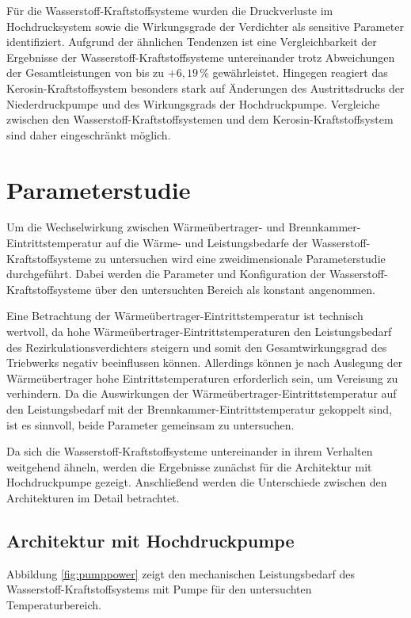 Für die Wasserstoff-Kraftstoffsysteme wurden die Druckverluste im Hochdrucksystem sowie die Wirkungsgrade der Verdichter als sensitive Parameter identifiziert. Aufgrund der ähnlichen Tendenzen ist eine Vergleichbarkeit der Ergebnisse der Wasserstoff-Kraftstoffsysteme untereinander trotz Abweichungen der Gesamtleistungen von bis zu $+6,19\,\%$ gewährleistet. Hingegen reagiert das Kerosin-Kraftstoffsystem besonders stark auf Änderungen des Austrittsdrucks der Niederdruckpumpe und des Wirkungsgrads der Hochdruckpumpe. Vergleiche zwischen den Wasserstoff-Kraftstoffsystemen und dem Kerosin-Kraftstoffsystem sind daher eingeschränkt möglich.

\section{Parameterstudie}

Um die Wechselwirkung zwischen Wärmeübertrager- und Brennkammer-Eintrittstemperatur auf die Wärme- und Leistungsbedarfe der Wasserstoff-Kraftstoffsysteme zu untersuchen wird eine zweidimensionale Parameterstudie durchgeführt. Dabei werden die Parameter und Konfiguration der Wasserstoff-Kraftstoffsysteme über den untersuchten Bereich als konstant angenommen. 

Eine Betrachtung der Wärmeübertrager-Eintrittstemperatur ist technisch wertvoll, da hohe Wärmeübertrager-Eintrittstemperaturen den Leistungsbedarf des Rezirkulationsverdichters steigern und somit den Gesamtwirkungsgrad des Triebwerks negativ beeinflussen können. Allerdings können je nach Auslegung der Wärmeübertrager hohe Eintrittstemperaturen erforderlich sein, um Vereisung zu verhindern. Da die Auswirkungen der Wärmeübertrager-Eintrittstemperatur auf den Leistungsbedarf mit der Brennkammer-Eintrittstemperatur gekoppelt sind, ist es sinnvoll, beide Parameter gemeinsam zu untersuchen. 

Da sich die Wasserstoff-Kraftstoffsysteme untereinander in ihrem Verhalten weitgehend ähneln, werden die Ergebnisse zunächst für die Architektur mit Hochdruckpumpe gezeigt. Anschließend werden die Unterschiede zwischen den Architekturen im Detail betrachtet.

\subsection{Architektur mit Hochdruckpumpe}

Abbildung \ref{fig:pumppower} zeigt den mechanischen Leistungsbedarf des Wasserstoff-Kraftstoffsystems mit Pumpe für den untersuchten Temperaturbereich. 

